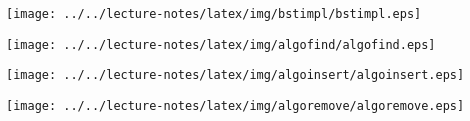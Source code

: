 \documentclass[a4paper, 10pt]{article}
\begin{document}
\begin{center}
  \texttt{[image: ../../lecture-notes/latex/img/bstimpl/bstimpl.eps]}
\end{center}

\begin{multicols}{2}
\begin{center}
  \texttt{[image: ../../lecture-notes/latex/img/algofind/algofind.eps]}
\end{center}
\columnbreak
\begin{center}
  \texttt{[image: ../../lecture-notes/latex/img/algoinsert/algoinsert.eps]}
\end{center}
\end{multicols}

\begin{center}
  \texttt{[image: ../../lecture-notes/latex/img/algoremove/algoremove.eps]}
\end{center}
\end{document}
